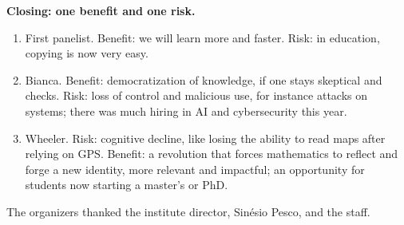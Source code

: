 \medskip\noindent
{\bf Closing: one benefit and one risk.}
\begin{enumerate}
\item First panelist. Benefit: we will learn
more and faster. Risk: in education, copying
is now very easy.
\item Bianca. Benefit: democratization of
knowledge, if one stays skeptical and
checks. Risk: loss of control and malicious
use, for instance attacks on systems; there
was much hiring in AI and cybersecurity this
year.
\item Wheeler. Risk: cognitive decline, like
losing the ability to read maps after
relying on GPS. Benefit: a revolution that
forces mathematics to reflect and forge a
new identity, more relevant and impactful;
an opportunity for students now starting a
master's or PhD.
\end{enumerate}

\noindent
The organizers thanked the institute
director, Sin\'esio Pesco, and the staff.





